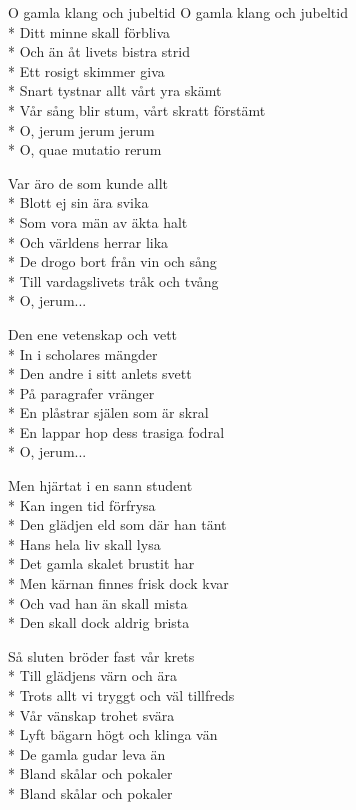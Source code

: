 \documentclass[a4paper, twoside, titlepage]{blad}
\begin{document}
\begin{sang}{O gamla klang och jubeltid}
O gamla klang och jubeltid\\*
Ditt minne skall förbliva\\*
Och än åt livets bistra strid\\*
Ett rosigt skimmer giva\\*
Snart tystnar allt vårt yra skämt\\*
Vår sång blir stum, vårt skratt förstämt\\*
O, jerum jerum jerum\\*
O, quae mutatio rerum

Var äro de som kunde allt\\*
Blott ej sin ära svika\\*
Som vora män av äkta halt\\*
Och världens herrar lika\\*
De drogo bort från vin och sång\\*
Till vardagslivets tråk och tvång\\*
O, jerum...

Den ene vetenskap och vett\\*
In i scholares mängder\\*
Den andre i sitt anlets svett\\*
På paragrafer vränger\\*
En plåstrar själen som är skral\\*
En lappar hop dess trasiga fodral\\*
O, jerum...

Men hjärtat i en sann student\\*
Kan ingen tid förfrysa\\*
Den glädjen eld som där han tänt\\*
Hans hela liv skall lysa\\*
Det gamla skalet brustit har\\*
Men kärnan finnes frisk dock kvar\\*
Och vad han än skall mista\\*
Den skall dock aldrig brista

Så sluten bröder fast vår krets\\*
Till glädjens värn och ära\\*
Trots allt vi tryggt och väl tillfreds\\*
Vår vänskap trohet svära\\*
Lyft bägarn högt och klinga vän\\*
De gamla gudar leva än\\*
Bland skålar och pokaler\\*
Bland skålar och pokaler
\end{sang}
\end{document}
